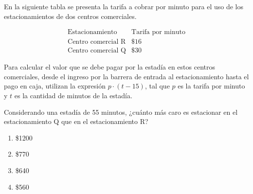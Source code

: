 \begin{problem}
    En la siguiente tabla se presenta la tarifa a cobrar por minuto para el uso de los estacionamientos de dos centros comerciales.

    \[
    \begin{array}{c|c}
    \text{Estacionamiento} & \text{Tarifa por minuto} \\
    \hline
    \text{Centro comercial R} & \$16 \\
    \text{Centro comercial Q} & \$30
    \end{array}
    \]

    Para calcular el valor que se debe pagar por la estadía en estos centros comerciales, desde el ingreso por la barrera de entrada al estacionamiento hasta el pago en caja, utilizan la expresión $p \cdot (t - 15)$, tal que $p$ es la tarifa por minuto y $t$ es la cantidad de minutos de la estadía.

    Considerando una estadía de 55 minutos, ¿cuánto más caro es estacionar en el estacionamiento Q que en el estacionamiento R?

    \begin{enumerate}[label=\Alph*.]
        \item \$1200
        \item \$770
        \item \$640
        \item \$560
    \end{enumerate}
\end{problem}
